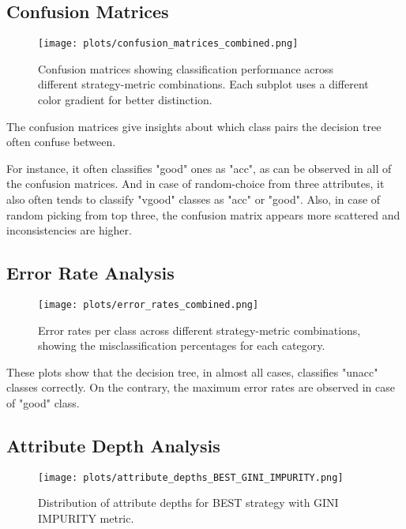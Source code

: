 \documentclass[12pt]{article}
\begin{document}
\newpage

\subsection{Confusion Matrices}
\begin{figure}[H]
    \centering
    \texttt{[image: plots/confusion\_matrices\_combined.png]}
    \caption{Confusion matrices showing classification performance across different strategy-metric combinations. Each subplot uses a different color gradient for better distinction.}
    \label{fig:confusion-matrices}
\end{figure}

The confusion matrices give insights about which class pairs the decision tree often confuse between.

For instance, it often classifies "good" ones as "acc", as can be observed in all of the confusion matrices. And in case of random-choice from three attributes, it also often tends to classify "vgood" classes as "acc" or "good". Also, in case of random picking from top three, the confusion matrix appears more scattered and inconsistencies are higher.

\newpage

\subsection{Error Rate Analysis}
\begin{figure}[H]
    \centering
    \texttt{[image: plots/error\_rates\_combined.png]}
    \caption{Error rates per class across different strategy-metric combinations, showing the misclassification percentages for each category.}
    \label{fig:error-rates}
\end{figure}

These plots show that the decision tree, in almost all cases, classifies "unacc" classes correctly. On the contrary, the maximum error rates are observed in case of "good" class.

\newpage

\subsection{Attribute Depth Analysis}
\begin{figure}[H]
    \centering
    \texttt{[image: plots/attribute\_depths\_BEST\_GINI\_IMPURITY.png]}
    \caption{Distribution of attribute depths for BEST strategy with GINI IMPURITY metric.}
    \label{fig:attr-best-gini}
\end{figure}
\end{document}
